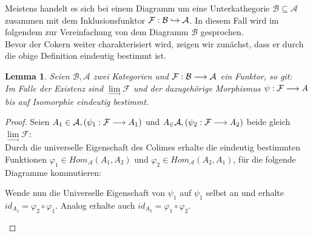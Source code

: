 \documentclass[10pt,a4paper]{report}
\newcommand{\comment}[1]{}
\newtheorem{lemma}[satz]{Lemma}
\newcommand{\functionfront}[3]{\nolinebreak{#1:#2 \longrightarrow #3}}
\newcommand{\colimes}[0]{\lim\limits_{ \longrightarrow }}
\newcommand{\infunctionfront}[3]{\nolinebreak{#1:#2 \hookrightarrow #3}}
\begin{document}
Meistens handelt es sich bei einem Diagramm um eine Unterkathegorie $\mathcal{B} \subseteq \mathcal{A}$ zusammen mit dem Inklusionsfunktor $\infunctionfront{\mathcal{F}}{\mathcal{B}}{\mathcal{A}}$. In diesem Fall wird im folgendem zur Vereinfachung von dem Diagramm $\mathcal{B}$ gesprochen.\\
Bevor der Cokern weiter charakterisiert wird, zeigen wir zunächst, dass er durch die obige Definition eindeutig bestimmt ist.
\begin{lemma}
Seien $\mathcal{B},\mathcal{A}$ zwei Kategorien und $\functionfront{\mathcal{F}}{\mathcal{B}}{\mathcal{A}}$ ein Funktor, so git:\\ 
Im Falle der Existenz sind $\colimes \mathcal{F}$ und der dazugehörige Morphismus $\functionfront{\psi}{\mathcal{F}}{A}$ bis auf Isomorphie eindeutig bestimmt.
\end{lemma}
\begin{proof}
Seien $A_1 \in \mathcal{A}, (\functionfront{\psi_1}{\mathcal{F}}{A_1}) $ und $A_ \in \mathcal{A} , (\functionfront{\psi_2}{\mathcal{F}}{A_2}) $ beide gleich $\colimes \mathcal{F}$:\\
Durch die universelle Eigenschaft des Colimes erhalte die eindeutig bestimmten Funktionen $\varphi_1 \in Hom_{\mathcal{A}}(A_1,A_2)$ und $\varphi_2 \in Hom_{\mathcal{A}}(A_2,A_1)$, für die folgende Diagramme kommutieren:

\comment{$\functionfront{\varphi_1}{\mathcal{A}_1}{\mathcal{A}_2}$ und $\functionfront{\varphi_2}{\mathcal{A}_2}{\mathcal{A}_1}$}
\begin{center}
\end{center}
\begin{flushleft}
Wende nun die Universelle Eigenschaft von $\psi_1$ auf $\psi_1$ selbst an und erhalte $id_{A_1} = \varphi_2 \circ \varphi_1$. Analog erhalte auch $id_{A_2} = \varphi_1 \circ \varphi_2$.
\end{flushleft}
\begin{center}
\end{center}
\end{proof}
\end{document}

